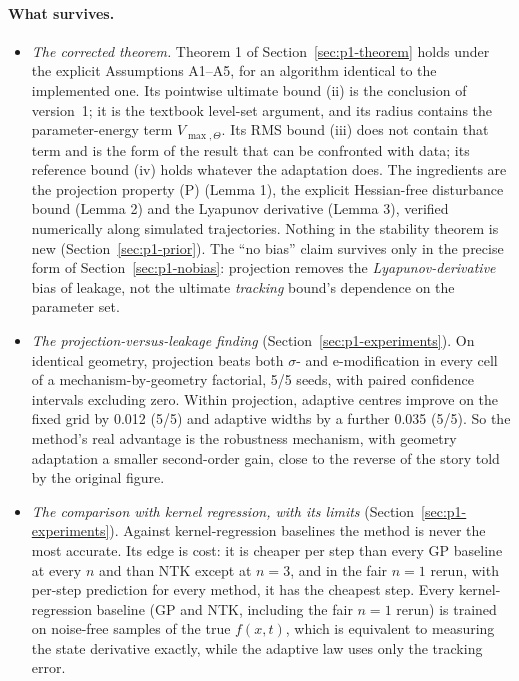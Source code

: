 \paragraph{What survives.}
\begin{itemize}
  \item \emph{The corrected theorem.} Theorem 1 of Section~\ref{sec:p1-theorem} holds under the explicit Assumptions
    A1--A5, for an algorithm identical to the implemented one. Its pointwise ultimate bound (ii) is the conclusion of
    version~1; it is the textbook level-set argument, and its radius contains the parameter-energy term
    $V_{\max,\Theta}$. Its RMS bound (iii) does not contain that term and is the form of the result that can be
    confronted with data; its reference bound (iv) holds whatever the adaptation does. The ingredients are the
    projection property (P) (Lemma 1), the explicit Hessian-free disturbance bound (Lemma 2) and the Lyapunov
    derivative (Lemma 3), verified numerically along simulated trajectories. Nothing in the stability theorem is new
    (Section~\ref{sec:p1-prior}). The ``no bias'' claim survives only in the precise form of
    Section~\ref{sec:p1-nobias}: projection removes the \emph{Lyapunov-derivative} bias of leakage, not the ultimate
    \emph{tracking} bound's dependence on the parameter set.
  \item \emph{The projection-versus-leakage finding} (Section~\ref{sec:p1-experiments}). On identical geometry,
    projection beats both $\sigma$- and e-modification in every cell of a mechanism-by-geometry factorial, 5/5 seeds,
    with paired confidence intervals excluding zero. Within projection, adaptive centres improve on the fixed grid by
    0.012 (5/5) and adaptive widths by a further 0.035 (5/5). So the method's real advantage is the robustness
    mechanism, with geometry adaptation a smaller second-order gain, close to the reverse of the story told by the
    original figure.
  \item \emph{The comparison with kernel regression, with its limits} (Section~\ref{sec:p1-experiments}). Against
    kernel-regression baselines the method is never the most accurate. Its edge is cost: it is cheaper per step than
    every GP baseline at every $n$ and than NTK except at $n = 3$, and in the fair $n = 1$ rerun, with per-step
    prediction for every method, it has the cheapest step. Every kernel-regression baseline (GP and NTK, including the
    fair $n = 1$ rerun) is trained on noise-free samples of the true $f(x,t)$, which is equivalent to measuring the
    state derivative exactly, while the adaptive law uses only the tracking error.
\end{itemize}

